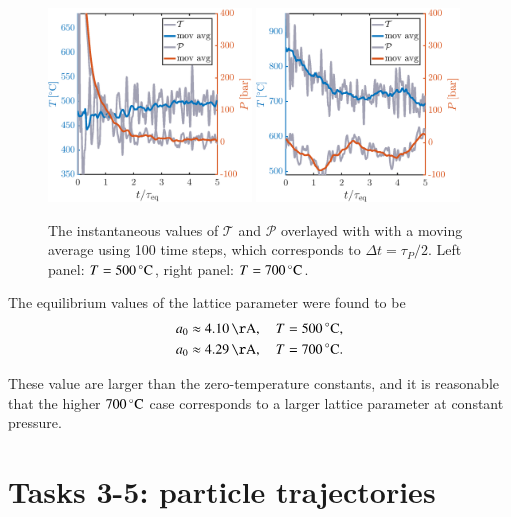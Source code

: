 \begin{figure}[!ht]
\begin{center}
  \includegraphics[width=0.48\textwidth]{../figures/TP-eq-500} 
    \includegraphics[width=0.48\textwidth]{../figures/TP-eq-700} 
  \caption{The instantaneous values of $\mathcal{T}$ and $\mathcal{P}$ overlayed with with a moving average using 100 time steps, which corresponds to $\Delta t = \tau_P/2$. Left panel: $T=\unit[500]{^\circ C}$,  right panel: $T=\unit[700]{^\circ C}$.}
  \label{fig:eq}
\end{center}
\end{figure}


The equilibrium values of the lattice parameter were found to be 
\begin{align}
a_0 &\approx \unit[4.10]{\AA}, \quad T=\unit[500]{^\circ C}, \\
a_0 &\approx \unit[4.29]{\AA}, \quad T=\unit[700]{^\circ C} .
\end{align} 

These value are larger than the zero-temperature constants, and it is reasonable that the higher $\unit[700]{^\circ C}$ case corresponds to a larger lattice parameter at constant pressure. 

\section*{Tasks 3-5: particle trajectories}

